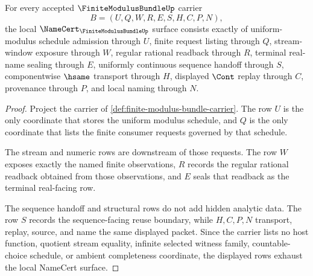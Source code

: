 \begin{theorem}
\label{thm:finite-modulus-bundle-namecert-obligations}
For every accepted $\FiniteModulusBundleUp$ carrier
$$
B=(U,Q,W,R,E,S,H,C,P,N),
$$
the local $\NameCert_{\FiniteModulusBundleUp}$ surface consists exactly of uniform-modulus schedule admission through $U$, finite request listing through $Q$, stream-window exposure through $W$, regular rational readback through $R$, terminal real-name sealing through $E$, uniformly continuous sequence handoff through $S$, componentwise $\hsame$ transport through $H$, displayed $\Cont$ replay through $C$, provenance through $P$, and local naming through $N$.
\end{theorem}
\begin{proof}
Project the carrier of \autoref{def:finite-modulus-bundle-carrier}. The row $U$ is the only coordinate that stores the uniform modulus schedule, and $Q$ is the only coordinate that lists the finite consumer requests governed by that schedule.

The stream and numeric rows are downstream of those requests. The row $W$ exposes exactly the named finite observations, $R$ records the regular rational readback obtained from those observations, and $E$ seals that readback as the terminal real-facing row.

The sequence handoff and structural rows do not add hidden analytic data. The row $S$ records the sequence-facing reuse boundary, while $H,C,P,N$ transport, replay, source, and name the same displayed packet. Since the carrier lists no host function, quotient stream equality, infinite selected witness family, countable-choice schedule, or ambient completeness coordinate, the displayed rows exhaust the local NameCert surface.
\end{proof}

